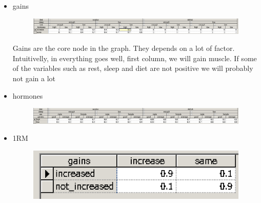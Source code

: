 \documentclass[11pt]{article}
\begin{document}
\begin{itemize}
\item gains
\begin{figure}[H]
\includegraphics[width=\textwidth]{./images/nodes/definitions/9.png}
\end{figure}
Gains are the core node in the graph. They depends on a lot of factor. Intuitivelly, in everything goes well, first column, we will gain muscle. If some of the variables such as rest, sleep and diet are not positive we will probably not gain a lot


\item hormones
\begin{figure}[H]
\includegraphics[width=\textwidth]{./images/nodes/definitions/10.png}
\end{figure}
\item 1RM
\begin{figure}[H]
\includegraphics[width=\textwidth]{./images/nodes/definitions/11.png}
\end{figure}
\end{itemize}
\end{document}
